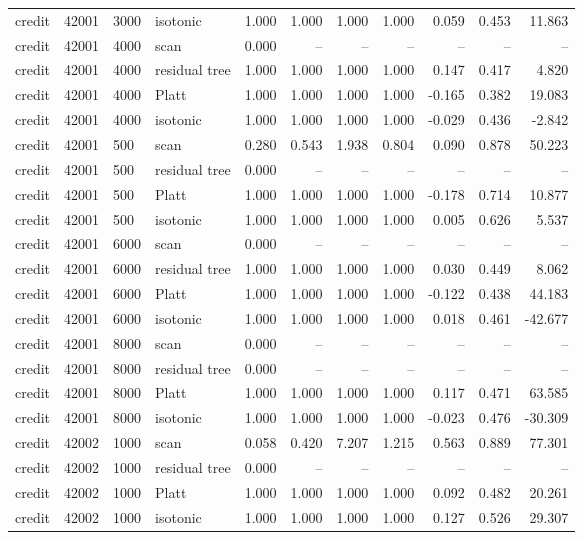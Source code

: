 \begin{tabular}{lrllrrrrrrr}
credit & 42001 & 3000 & isotonic & 1.000 & 1.000 & 1.000 & 1.000 & 0.059 & 0.453 & 11.863 \\
credit & 42001 & 4000 & scan & 0.000 & -- & -- & -- & -- & -- & -- \\
credit & 42001 & 4000 & residual tree & 1.000 & 1.000 & 1.000 & 1.000 & 0.147 & 0.417 & 4.820 \\
credit & 42001 & 4000 & Platt & 1.000 & 1.000 & 1.000 & 1.000 & -0.165 & 0.382 & 19.083 \\
credit & 42001 & 4000 & isotonic & 1.000 & 1.000 & 1.000 & 1.000 & -0.029 & 0.436 & -2.842 \\
credit & 42001 & 500 & scan & 0.280 & 0.543 & 1.938 & 0.804 & 0.090 & 0.878 & 50.223 \\
credit & 42001 & 500 & residual tree & 0.000 & -- & -- & -- & -- & -- & -- \\
credit & 42001 & 500 & Platt & 1.000 & 1.000 & 1.000 & 1.000 & -0.178 & 0.714 & 10.877 \\
credit & 42001 & 500 & isotonic & 1.000 & 1.000 & 1.000 & 1.000 & 0.005 & 0.626 & 5.537 \\
credit & 42001 & 6000 & scan & 0.000 & -- & -- & -- & -- & -- & -- \\
credit & 42001 & 6000 & residual tree & 1.000 & 1.000 & 1.000 & 1.000 & 0.030 & 0.449 & 8.062 \\
credit & 42001 & 6000 & Platt & 1.000 & 1.000 & 1.000 & 1.000 & -0.122 & 0.438 & 44.183 \\
credit & 42001 & 6000 & isotonic & 1.000 & 1.000 & 1.000 & 1.000 & 0.018 & 0.461 & -42.677 \\
credit & 42001 & 8000 & scan & 0.000 & -- & -- & -- & -- & -- & -- \\
credit & 42001 & 8000 & residual tree & 0.000 & -- & -- & -- & -- & -- & -- \\
credit & 42001 & 8000 & Platt & 1.000 & 1.000 & 1.000 & 1.000 & 0.117 & 0.471 & 63.585 \\
credit & 42001 & 8000 & isotonic & 1.000 & 1.000 & 1.000 & 1.000 & -0.023 & 0.476 & -30.309 \\
credit & 42002 & 1000 & scan & 0.058 & 0.420 & 7.207 & 1.215 & 0.563 & 0.889 & 77.301 \\
credit & 42002 & 1000 & residual tree & 0.000 & -- & -- & -- & -- & -- & -- \\
credit & 42002 & 1000 & Platt & 1.000 & 1.000 & 1.000 & 1.000 & 0.092 & 0.482 & 20.261 \\
credit & 42002 & 1000 & isotonic & 1.000 & 1.000 & 1.000 & 1.000 & 0.127 & 0.526 & 29.307 \\

\end{tabular}

